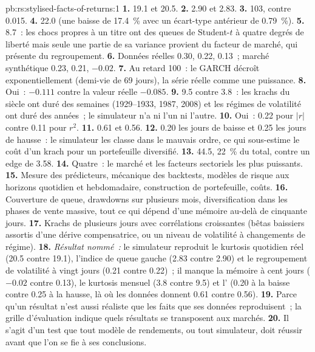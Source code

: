 \begin{solution}{pb:rs:stylised-facts-of-returns:1}
\textbf{1.} 19.1 et 20.5. \textbf{2.} 2.90 et 2.83. \textbf{3.} 103, contre 0.015. \textbf{4.} 22.0 (une baisse de 17.4~\% avec un
écart-type antérieur de 0.79~\%). \textbf{5.} 8.7~: les chocs propres à un titre ont des queues de Student-$t$ à quatre degrés de liberté
mais seule une partie de sa variance provient du facteur de marché, qui présente du regroupement. \textbf{6.} Données réelles 0.30, 0.22, 0.13~; marché synthétique 0.23,
0.21, $-0.02$. \textbf{7.} Au retard 100~: le GARCH décroît exponentiellement (demi-vie de 69 jours), la série réelle comme une puissance. \textbf{8.} Oui~:
$-0.111$ contre la valeur réelle $-0.085$. \textbf{9.} 9.5 contre 3.8~: les krachs du siècle ont duré des semaines (1929--1933, 1987, 2008) et
les régimes de volatilité ont duré des années~; le simulateur n'a ni l'un ni l'autre. \textbf{10.} Oui~: 0.22 pour $|r|$ contre 0.11 pour $r^2$.
\textbf{11.} 0.61 et 0.56. \textbf{12.} 0.20 les jours de baisse et 0.25 les jours de hausse~: le simulateur les classe dans le mauvais ordre, ce qui
sous-estime le coût d'un krach pour un portefeuille diversifié. \textbf{13.} 44.5, 22~\% du total, contre un edge de 3.58.
\textbf{14.} Quatre~: le marché et les facteurs sectoriels les plus puissants. \textbf{15.} Mesure des prédicteurs, mécanique des backtests, modèles de risque
aux horizons quotidien et hebdomadaire, construction de portefeuille, coûts. \textbf{16.} Couverture de queue, drawdowns sur plusieurs mois, diversification dans
les phases de vente massive, tout ce qui dépend d'une mémoire au-delà de cinquante jours. \textbf{17.} Krachs de plusieurs jours avec corrélations croissantes (bêtas
baissiers assortis d'une dérive compensatrice, ou un niveau de volatilité à changements de régime). \textbf{18.} \emph{Résultat nommé~:} le simulateur reproduit le
kurtosis quotidien réel (20.5 contre 19.1), l'indice de queue gauche (2.83 contre 2.90) et le regroupement de volatilité à vingt jours (0.21 contre 0.22)~;
il manque la mémoire à cent jours ($-0.02$ contre 0.13), le kurtosis mensuel (3.8 contre 9.5) et l'
(0.20 à la baisse contre 0.25 à la hausse, là où les données donnent 0.61 contre 0.56). \textbf{19.} Parce qu'un résultat n'est aussi réaliste que les faits
que ses données reproduisent~; la grille d'évaluation indique quels résultats se transposent aux marchés. \textbf{20.} Il s'agit d'un test que tout modèle de rendements, ou tout
simulateur, doit réussir avant que l'on se fie à ses conclusions.
\end{solution}


